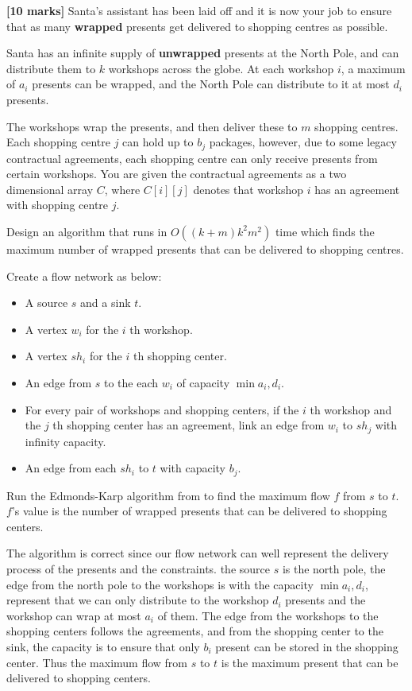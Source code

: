\documentclass{article}
\begin{document}
\setcounter{question}{2}

\begin{Question}

\begin{Subquestion}
\textbf{[10 marks]} 
Santa's assistant has been laid off and it is now your job to ensure that as many \textbf{wrapped} presents get delivered to shopping centres as possible.

Santa has an infinite supply of \textbf{unwrapped} presents at the North Pole, and can distribute them to $k$ workshops across the globe. At each workshop $i$, a maximum of $a_i$ presents can be wrapped, and the North Pole can distribute to it at most $d_i$ presents.

The workshops wrap the presents, and then deliver these to $m$ shopping centres. Each shopping centre $j$ can hold up to $b_j$ packages, however, due to some legacy contractual agreements, each shopping centre can only receive presents from certain workshops. You are given the contractual agreements as a two dimensional array $C$, where $C[i][j]$ denotes that workshop $i$ has an agreement with shopping centre $j$.

Design an algorithm that runs in $O((k+m)k^{2}m^{2})$ time which finds the maximum number of wrapped presents that can be delivered to shopping centres.
\end{Subquestion}

\begin{answer}
Create a flow network as below:
\begin{itemize}
    \item A source $s$ and a sink $t$.
    \item A vertex $w_i$ for the $i$ th workshop.
    \item A vertex $sh_i$ for the $i$ th shopping center.
    \item An edge from $s$ to the each $w_i$ of capacity $\min{a_i, d_i}$.
    \item For every pair of workshops and shopping centers, if the $i$ th workshop and the $j$ th shopping center has an agreement, link an edge from $w_i$ to $sh_j$ with infinity capacity.
    \item An edge from each $sh_i$ to $t$ with capacity  $b_j$.
\end{itemize}
Run the Edmonds-Karp algorithm from to find the maximum flow $f$ from $s$ to $t$. $f$'s value is the number of wrapped presents that can be delivered to shopping centers.

The algorithm is correct since our flow network can well represent the delivery process of the presents and the constraints. the source $s$ is the north pole, 
the edge from the north pole to the workshops is with the capacity $\min{a_i, d_i}$, represent that we can only distribute to the workshop $d_i$ presents and the workshop can wrap at most $a_i$ of them.
The edge from the workshops to the shopping centers follows the agreements, and from the shopping center to the sink, the capacity is to ensure that only $b_i$ present can be stored in the shopping center.
Thus the maximum flow from $s$ to $t$ is the maximum present that can be delivered to shopping centers.


\end{answer}
\end{Question}
\end{document}
